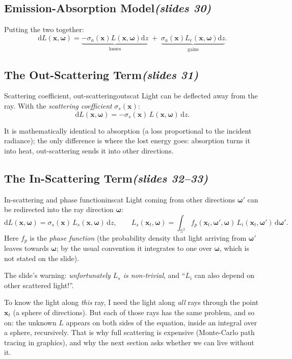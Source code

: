 \documentclass[11pt,a4paper]{article}
\newcommand{\slides}[1]{\texorpdfstring{\hfill{\normalfont\small\emph{(slides #1)}}}{ (slides #1)}}
\newcommand{\x}{\bm{x}}
\newcommand{\w}{\bm{\omega}}
\newcommand{\dd}{\,\mathrm{d}}
\newcommand{\Sph}{\mathbb{S}^2}
\theoremstyle{remark}\newtheorem*{remark}{Remark}
\begin{document}
\subsection{Emission-Absorption Model\slides{30}}

Putting the two together:
\[
\mathrm dL(\x,\w)=\underbrace{-\sigma_a(\x)L(\x,\w)\mathrm dz}_{\text{losses}}\;+\;\underbrace{\sigma_a(\x)L_e(\x,\w)\mathrm dz}_{\text{gains}} .
\]

\subsection{The Out-Scattering Term\slides{31}}

\begin{definition}{Scattering coefficient, out-scattering}{outscat}
Light can be deflected away from the ray. With the \emph{scattering coefficient} $\sigma_s(\x)$:
\[
\mathrm dL(\x,\w)=-\sigma_s(\x)\,L(\x,\w)\,\mathrm dz .
\]
\end{definition}
It is mathematically identical to absorption (a loss proportional to the incident radiance); the only difference is where the lost energy goes: absorption turns it into heat, out-scattering sends it into other directions.

\subsection{The In-Scattering Term\slides{32--33}}

\begin{definition}{In-scattering and phase function}{inscat}
Light coming from other directions $\w'$ can be redirected into the ray direction $\w$:
\[
\mathrm dL(\x,\w)=\sigma_s(\x)\,L_s(\x,\w)\,\mathrm dz,\qquad
L_s(\x_t,\w)=\int_{\Sph}f_p(\x_t,\w',\w)\,L_i(\x_t,\w')\dd\w' .
\]
Here $f_p$ is the \emph{phase function} (the probability density that light arriving from $\w'$ leaves towards $\w$; by the usual convention it integrates to one over $\w$, which is not stated on the slide).
\end{definition}

The slide's warning: \emph{unfortunately $L_s$ is non-trivial}, and ``$L_i$ can also depend on other scattered light!''.

\begin{intuition}
To know the light along \emph{this} ray, I need the light along \emph{all} rays through the point $\x_t$ (a sphere of directions). But each of those rays has the same problem, and so on: the unknown $L$ appears on both sides of the equation, inside an integral over a sphere, recursively. That is why full scattering is expensive (Monte-Carlo path tracing in graphics), and why the next section asks whether we can live without it.
\end{intuition}
\end{document}
